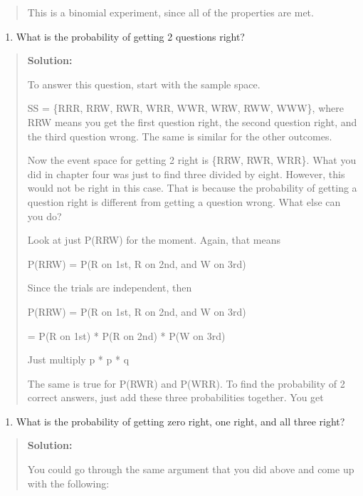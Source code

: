 \documentclass[]{book}
\providecommand{\tightlist}{%
  \setlength{\itemsep}{0pt}\setlength{\parskip}{0pt}}
\begin{document}
\begin{quote}
This is a binomial experiment, since all of the properties are met.
\end{quote}

\begin{enumerate}
\def\labelenumi{\alph{enumi}.}
\setcounter{enumi}{2}
\tightlist
\item
  What is the probability of getting 2 questions right?
\end{enumerate}

\begin{quote}
\textbf{Solution:}

To answer this question, start with the sample space.

SS = \{RRR, RRW, RWR, WRR, WWR, WRW, RWW, WWW\}, where RRW means you get
the first question right, the second question right, and the third
question wrong. The same is similar for the other outcomes.

Now the event space for getting 2 right is \{RRW, RWR, WRR\}. What you
did in chapter four was just to find three divided by eight. However,
this would not be right in this case. That is because the probability
of getting a question right is different from getting a question
wrong. What else can you do?

Look at just P(RRW) for the moment. Again, that means

P(RRW) = P(R on 1st, R on 2nd, and W on 3rd)

Since the trials are independent, then

P(RRW) = P(R on 1st, R on 2nd, and W on 3rd)

= P(R on 1st) * P(R on 2nd) * P(W on 3rd)

Just multiply p * p * q

The same is true for P(RWR) and P(WRR). To find the probability of 2
correct answers, just add these three probabilities together. You get
\end{quote}

\begin{enumerate}
\def\labelenumi{\alph{enumi}.}
\setcounter{enumi}{3}
\tightlist
\item
  What is the probability of getting zero right, one right, and all
  three right?
\end{enumerate}

\begin{quote}
\textbf{Solution:}

You could go through the same argument that you did above and come up
with the following:
\end{quote}
\end{document}
